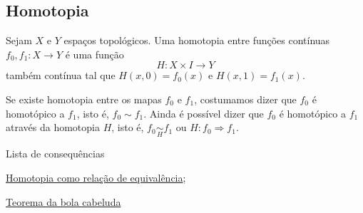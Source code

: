 \subsection{Homotopia}
\label{homotopia-def}
\begin{defi}[Homotopia]
	Sejam $X$ e $Y$ espaços topológicos. Uma homotopia entre funções contínuas $f_0, f_1: X\rightarrow Y$ é uma função $$H:X\times I\rightarrow Y$$ também contínua tal que $H(x,0)=f_0(x)$ e $H(x,1)=f_1(x)$.
\end{defi}

Se existe homotopia entre os mapas $f_0$ e $f_1$, costumamos dizer que $f_0$ é homotópico a $f_1$, isto é, $f_0\sim f_1$. Ainda é possível dizer que $f_0$ é homotópico a $f_1$ através da homotopia $H$, isto é, $f_0 \underset{H}{\sim} f_1$ ou $H:f_0\Rightarrow f_1$.

\begin{titlemize}{Lista de consequências}
	\item \hyperref[homotopia-relaçao-de-equivalencia]{Homotopia como relação de equivalência};\\ %
	\item \hyperref[homotopia-teorema-da-bola-cabeluda]{Teorema da bola cabeluda}
\end{titlemize}

